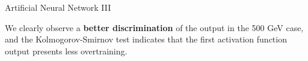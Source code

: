 \documentclass[8 pt]{beamer}
\begin{document}
\begin{frame}{Artificial Neural Network III}
   	\hspace{4pt}
   \begin{minipage}[c]{.02\linewidth}
	\begin{exampleblock}{}  \end{exampleblock}
   \end{minipage}
   \hspace{5pt}
	\begin{minipage}[c]{.44\linewidth}
   \end{minipage} \hfill
   \hspace{10pt}
   \begin{minipage}[c]{.44\linewidth}
   \end{minipage} \hfill \vfill
	
	\justifying
	We clearly observe a \textbf{better discrimination} of the output in the 500 GeV case, and the Kolmogorov-Smirnov test indicates that the first activation function output presents less overtraining. \vfill

\end{frame}
\end{document}

